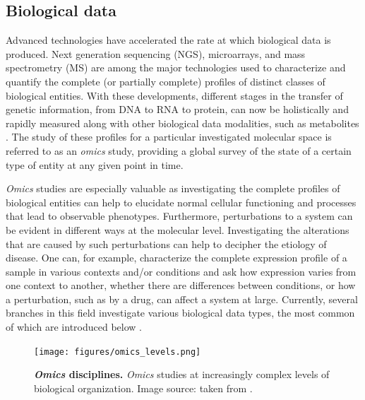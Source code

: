 \subsection{Biological data}

Advanced technologies have accelerated the rate at which biological data is produced. Next generation sequencing (NGS), microarrays, and mass spectrometry (MS) are among the major technologies used to characterize and quantify the complete (or partially complete) profiles of distinct classes of biological entities. With these developments, different stages in the transfer of genetic information, from DNA to RNA to protein, can now be holistically and rapidly measured along with other biological data modalities, such as metabolites \parencite{hsiao2009}. The study of these profiles for a particular investigated molecular space is referred to as an \textit{omics} study, providing a global survey of the state of a certain type of entity at any given point in time. 

\textit{Omics} studies are especially valuable as investigating the complete profiles of biological entities can help to elucidate normal cellular functioning and processes that lead to observable phenotypes. Furthermore, perturbations to a system can be evident in different ways at the molecular level. Investigating the alterations that are caused by such perturbations can help to decipher the etiology of disease. One can, for example, characterize the complete expression profile of a sample in various contexts and/or conditions and ask how expression varies from one context to another, whether there are differences between conditions, or how a perturbation, such as by a drug, can affect a system at large. Currently, several branches in this field investigate various biological data types, the most common of which are introduced below \parencite{hasin2017, manzoni2018, lightbody2019, cai2022}.

\begin{figure}[ht]
    \centering
	\texttt{[image: figures/omics\_levels.png]}
	\caption{\footnotesize \textbf{\textit{Omics} disciplines.} \textit{Omics} studies at increasingly complex levels of  biological organization. Image source: taken from \parencite{kim2016}.}
\end{figure}

